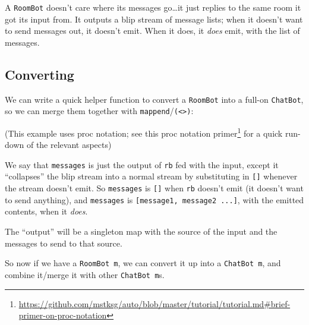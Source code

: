 \documentclass[]{article}
\newenvironment{Shaded}{}{}
\newcommand{\KeywordTok}[1]{\textcolor[rgb]{0.00,0.44,0.13}{\textbf{{#1}}}}
\newcommand{\DataTypeTok}[1]{\textcolor[rgb]{0.56,0.13,0.00}{{#1}}}
\newcommand{\OtherTok}[1]{\textcolor[rgb]{0.00,0.44,0.13}{{#1}}}
\newcommand{\FunctionTok}[1]{\textcolor[rgb]{0.02,0.16,0.49}{{#1}}}
\newcommand{\NormalTok}[1]{{#1}}
\renewcommand{\href}[2]{#2\footnote{\url{#1}}}
\begin{document}
A \texttt{RoomBot} doesn't care where its messages go\ldots{}it just
replies to the same room it got its input from. It outputs a blip stream
of message lists; when it doesn't want to send messages out, it doesn't
emit. When it does, it \emph{does} emit, with the list of messages.

\subsection{Converting}\label{converting}

We can write a quick helper function to convert a \texttt{RoomBot} into
a full-on \texttt{ChatBot}, so we can merge them together with
\texttt{mappend}/\texttt{(\textless{}\textgreater{})}:

\begin{Shaded}
\end{Shaded}

(This example uses proc notation; see this
\href{https://github.com/mstksg/auto/blob/master/tutorial/tutorial.md\#brief-primer-on-proc-notation}{proc
notation primer} for a quick run-down of the relevant aspects)

We say that \texttt{messages} is just the output of \texttt{rb} fed with
the input, except it ``collapses'' the blip stream into a normal stream
by substituting in \texttt{{[}{]}} whenever the stream doesn't emit. So
\texttt{messages} is \texttt{{[}{]}} when \texttt{rb} doesn't emit (it
doesn't want to send anything), and \texttt{messages} is
\texttt{{[}message1,\ message2\ ...{]}}, with the emitted contents, when
it \emph{does}.

The ``output'' will be a singleton map with the source of the input and
the messages to send to that source.

So now if we have a \texttt{RoomBot\ m}, we can convert it up into a
\texttt{ChatBot\ m}, and combine it/merge it with other
\texttt{ChatBot\ m}s.
\end{document}
